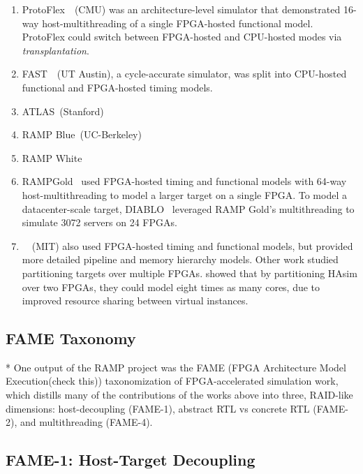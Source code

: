 \begin{enumerate}
    \item ProtoFlex~\cite{ProtoFlex}~(CMU) was an architecture-level simulator that
demonstrated 16-way host-multithreading of a single FPGA-hosted functional model.
ProtoFlex could switch between FPGA-hosted and CPU-hosted modes via
\emph{transplantation}.

\item FAST~\cite{FAST}~(UT Austin), a cycle-accurate simulator, was
split into CPU-hosted functional and FPGA-hosted timing models.


\item ATLAS~(Stanford)

\item RAMP Blue~(UC-Berkeley)

\item RAMP White

\item RAMPGold~\cite{RAMPGold} used FPGA-hosted timing and functional models
with 64-way host-multithreading to model a larger target on a single
FPGA.  To model a datacenter-scale target,
DIABLO~\cite{Diablo}
leveraged RAMP Gold's multithreading to simulate 3072 servers on 24 FPGAs.

\item ~\cite{HASim}~(MIT) also used FPGA-hosted timing and functional
models, but provided more detailed pipeline and memory hierarchy
models. Other work studied partitioning targets over multiple FPGAs.
\cite{LIFPGADesign} showed that by partitioning HAsim over two FPGAs, they
could model eight times as many cores, due to improved resource sharing between
virtual instances.

\end{enumerate}

\subsection{FAME Taxonomy}

* One output of the RAMP project was the FAME (FPGA Architecture Model
Execution(check this)) taxonomization of FPGA-accelerated simulation work,
which distills many of the contributions of the works above into three,
RAID-like dimensions: host-decoupling (FAME-1), abstract RTL vs concrete RTL
(FAME-2), and multithreading (FAME-4).

\subsection{FAME-1: Host-Target Decoupling}\label{sec:fame1}

